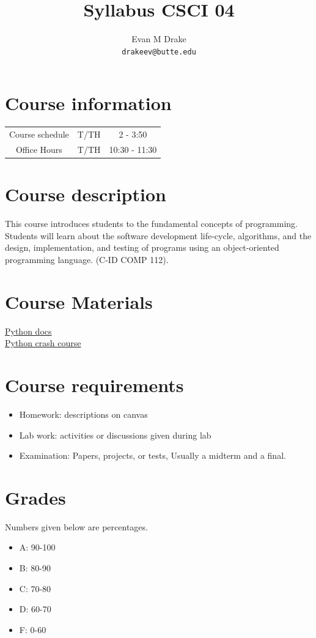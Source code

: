 \documentclass[12pt]{article}
\title{Syllabus CSCI 04}
\author{
	Evan M Drake \\
	\texttt{drakeev@butte.edu}
}
\begin{document}
	\maketitle
	\section*{Course information}
		\begin{center}
			\begin{tabular} { c c c }
				Course schedule & T/TH & 2 - 3:50 \\
				Office Hours & T/TH & 10:30 - 11:30
			\end{tabular}
		\end{center}

	\section*{Course description}
		This course introduces students to the fundamental concepts of programming. Students will learn about the software
		development life-cycle, algorithms, and the design, implementation, and testing of programs using an object-oriented programming
		language. (C-ID COMP 112).

	\section*{Course Materials}
		\href{https://www.python.org/doc/}{Python docs} \\
		\href{https://www.learnpython.org/}{Python crash course} \\

	\section*{Course requirements}
		\begin{center}
			\begin{itemize}
				\item Homework: descriptions on canvas
				\item Lab work: activities or discussions given during lab
				\item Examination: Papers, projects, or tests, Usually a midterm and a final.
			\end{itemize}
		\end{center}

	\section*{Grades}
		Numbers given below are percentages.
		\begin{itemize}
			\item A: 90-100
			\item B: 80-90
			\item C: 70-80
			\item D: 60-70
			\item F: 0-60
		\end{itemize}
	
\end{document}
